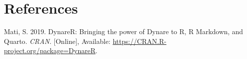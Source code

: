 \documentclass[11pt,preprint]{elsarticle}
\numberwithin{equation}{section}
\numberwithin{figure}{section}
\numberwithin{table}{section}
\newlength{\cslhangindent}
\newenvironment{CSLReferences}[2] %
{\begin{list}{}{%
	\setlength{\itemindent}{0pt}
	\setlength{\leftmargin}{0pt}
	\setlength{\parsep}{0pt}
	\ifodd #1
	\setlength{\leftmargin}{\cslhangindent}
	\setlength{\itemindent}{-1\cslhangindent}
	\fi
	\setlength{\itemsep}{#2\baselineskip}}}
{\end{list}}
\begin{document}
\newpage

\section*{References}\label{references}

\label{refs}
\begin{CSLReferences}{1}{1}
Mati, S. 2019. DynareR: Bringing the power of {Dynare} to {R}, {R
Markdown}, and {Quarto}. \emph{CRAN}. {[}Online{]}, Available:
\url{https://CRAN.R-project.org/package=DynareR}.

\end{CSLReferences}


\end{document}
